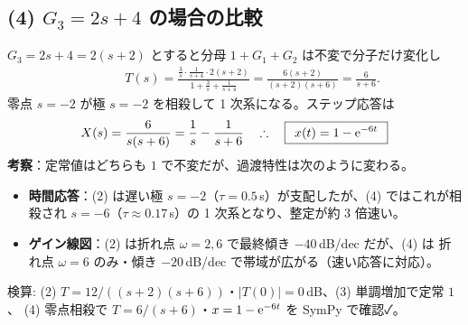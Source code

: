 \documentclass[11pt,a4paper]{article}
\begin{document}
\subsection*{(4) $G_3=2s+4$ の場合の比較}
$G_3=2s+4=2(s+2)$ とすると分母 $1+G_1+G_2$ は不変で分子だけ変化し
\begin{align*}
  &\qquad T(s)=\frac{\frac3s\cdot\frac{1}{s+4}\cdot2(s+2)}{1+\frac3s+\frac{1}{s+4}}
   =\frac{6(s+2)}{(s+2)(s+6)}=\frac{6}{s+6}.
\end{align*}
零点 $s=-2$ が極 $s=-2$ を相殺して 1 次系になる。ステップ応答は
\[
  X(s)=\frac{6}{s(s+6)}=\frac1s-\frac{1}{s+6}
  \quad\therefore\quad \boxed{\,\;x(t)=1-\mathrm{e}^{-6t}\;\,}
\]
\textbf{考察}：定常値はどちらも $1$ で不変だが、過渡特性は次のように変わる。
\begin{itemize}\setlength{\itemsep}{1pt}
  \item \textbf{時間応答}：(2) は遅い極 $s=-2$（$\tau=0.5\,$s）が支配したが、(4) ではこれが相殺され
        $s=-6$（$\tau\approx0.17\,$s）の 1 次系となり、整定が約 3 倍速い。
  \item \textbf{ゲイン線図}：(2) は折れ点 $\omega=2,6$ で最終傾き $-40\,$dB/dec だが、(4) は
        折れ点 $\omega=6$ のみ・傾き $-20\,$dB/dec で帯域が広がる（速い応答に対応）。
\end{itemize}

\bigskip
\noindent 検算: (2) $T=12/((s+2)(s+6))$・$|T(0)|=0\,$dB、(3) 単調増加で定常 $1$、
(4) 零点相殺で $T=6/(s+6)$・$x=1-\mathrm{e}^{-6t}$ を SymPy で確認✓。
\end{document}
